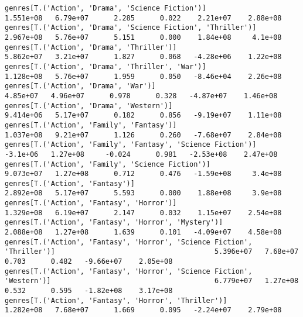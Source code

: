 \documentclass[11pt]{article}
\begin{document}
\begin{Verbatim}[commandchars=\\\{\}]
genres[T.('Action', 'Drama', 'Science Fiction')]                                                              1.551e+08   6.79e+07      2.285      0.022    2.21e+07    2.88e+08
genres[T.('Action', 'Drama', 'Science Fiction', 'Thriller')]                                                  2.967e+08   5.76e+07      5.151      0.000    1.84e+08     4.1e+08
genres[T.('Action', 'Drama', 'Thriller')]                                                                     5.862e+07   3.21e+07      1.827      0.068   -4.28e+06    1.22e+08
genres[T.('Action', 'Drama', 'Thriller', 'War')]                                                              1.128e+08   5.76e+07      1.959      0.050   -8.46e+04    2.26e+08
genres[T.('Action', 'Drama', 'War')]                                                                           4.85e+07   4.96e+07      0.978      0.328   -4.87e+07    1.46e+08
genres[T.('Action', 'Drama', 'Western')]                                                                      9.414e+06   5.17e+07      0.182      0.856   -9.19e+07    1.11e+08
genres[T.('Action', 'Family', 'Fantasy')]                                                                     1.037e+08   9.21e+07      1.126      0.260   -7.68e+07    2.84e+08
genres[T.('Action', 'Family', 'Fantasy', 'Science Fiction')]                                                   -3.1e+06   1.27e+08     -0.024      0.981   -2.53e+08    2.47e+08
genres[T.('Action', 'Family', 'Science Fiction')]                                                             9.073e+07   1.27e+08      0.712      0.476   -1.59e+08     3.4e+08
genres[T.('Action', 'Fantasy')]                                                                               2.892e+08   5.17e+07      5.593      0.000    1.88e+08     3.9e+08
genres[T.('Action', 'Fantasy', 'Horror')]                                                                     1.329e+08   6.19e+07      2.147      0.032    1.15e+07    2.54e+08
genres[T.('Action', 'Fantasy', 'Horror', 'Mystery')]                                                          2.088e+08   1.27e+08      1.639      0.101   -4.09e+07    4.58e+08
genres[T.('Action', 'Fantasy', 'Horror', 'Science Fiction', 'Thriller')]                                      5.396e+07   7.68e+07      0.703      0.482   -9.66e+07    2.05e+08
genres[T.('Action', 'Fantasy', 'Horror', 'Science Fiction', 'Western')]                                       6.779e+07   1.27e+08      0.532      0.595   -1.82e+08    3.17e+08
genres[T.('Action', 'Fantasy', 'Horror', 'Thriller')]                                                         1.282e+08   7.68e+07      1.669      0.095   -2.24e+07    2.79e+08

\end{Verbatim}
\end{document}
